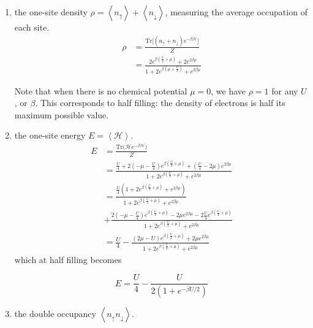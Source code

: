 \begin{enumerate}
\item the one-site density $\rho = \left\langle n_\uparrow \right\rangle + \left\langle n_\downarrow \right\rangle$, measuring the average occupation of each site.
\begin{equation}
\begin{split}
\rho &= \frac{\text{Tr} \big[ (n_\uparrow + n_\downarrow ) e^{-\beta\mathcal{H}} \big]}{Z} \\
&= \frac{2 e^{\beta(\frac{U}{2} + \mu)} + 2 e^{2\beta\mu}}{1 + 2 e^{\beta(\mu + \frac{U}{2})} + e^{2 \beta \mu}}
\end{split}
\end{equation}

Note that when there is no chemical potential $\mu = 0$, we have $\rho = 1$ for any $U$, or $\beta$. This corresponds to half filling: the density of electrons is half its maximum possible value.

\item the one-site energy $E = \left\langle \mathcal{H} \right\rangle$.
\begin{equation}
\begin{split}
E &= \frac{\text{Tr}\bigg( \mathcal{H}e^{-\beta\mathcal{H} } \bigg)}{Z} \\
&= \frac{ \frac{U}{4} + 2 ( -\mu - \frac{U}{4} ) e^{\beta(\frac{U}{2} + \mu )} + (\frac{U}{4} - 2\mu ) e^{2\beta\mu}}{1 + 2 e^{\beta (\frac{U}{2} + \mu )} + e^{2\beta\mu} } \\
&= \frac{ \frac{U}{4} ( 1 + 2 e^{\beta (\frac{U}{2} + \mu )} + e^{2\beta\mu} )}{1 + 2 e^{\beta (\frac{U}{2} + \mu )} + e^{2\beta\mu} } \\
&+ \frac{2(-\mu - \frac{U}{4}) e^{\beta(\frac{U}{2} + \mu)} - 2\mu e^{2\beta\mu} - 2\frac{U}{4} e^{\beta (\frac{U}{2} + \mu)} }{1 + 2 e^{\beta (\frac{U}{2} + \mu )} + e^{2\beta\mu}} \\
&= \frac{U}{4} - \frac{ (2\mu - U) e^{\beta(\frac{U}{2} + \mu) } + 2\mu e^{2\beta\mu} }{1 + 2 e^{\beta (\frac{U}{2} + \mu )} + e^{2\beta\mu} }
\end{split}
\end{equation}
which at half filling becomes

\begin{equation}
E = \frac{U}{4} - \frac{U}{2 ( 1 + e^{-\beta U /2} )}
\end{equation}

\item the double occupancy $\left\langle n_\uparrow n_\downarrow \right\rangle$.


\end{enumerate}
